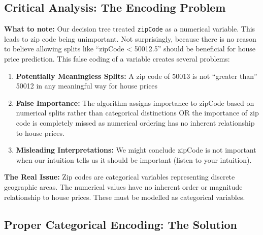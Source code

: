 \documentclass[
  letterpaper,
  DIV=11,
  numbers=noendperiod]{scrartcl}
\providecommand{\tightlist}{%
  \setlength{\itemsep}{0pt}\setlength{\parskip}{0pt}}
\begin{document}
\subsection{Critical Analysis: The Encoding
Problem}\label{critical-analysis-the-encoding-problem}

\begin{tcolorbox}[enhanced jigsaw, bottomrule=.15mm, titlerule=0mm, colbacktitle=quarto-callout-warning-color!10!white, opacityback=0, colback=white, leftrule=.75mm, breakable, bottomtitle=1mm, colframe=quarto-callout-warning-color-frame, opacitybacktitle=0.6, title=\textcolor{quarto-callout-warning-color}{\faExclamationTriangle}\hspace{0.5em}{⚠️ The Problem Revealed}, toptitle=1mm, toprule=.15mm, rightrule=.15mm, left=2mm, arc=.35mm, coltitle=black]

\textbf{What to note:} Our decision tree treated \texttt{zipCode} as a
numerical variable. This leads to zip code being unimportant. Not
surprisingly, because there is no reason to believe allowing splits like
``zipCode \textless{} 50012.5'' should be beneficial for house price
prediction. This false coding of a variable creates several problems:

\begin{enumerate}
\def\labelenumi{\arabic{enumi}.}
\tightlist
\item
  \textbf{Potentially Meaningless Splits:} A zip code of 50013 is not
  ``greater than'' 50012 in any meaningful way for house prices
\item
  \textbf{False Importance:} The algorithm assigns importance to zipCode
  based on numerical splits rather than categorical distinctions OR the
  importance of zip code is completely missed as numerical ordering has
  no inherent relationship to house prices.
\item
  \textbf{Misleading Interpretations:} We might conclude zipCode is not
  important when our intuition tells us it should be important (listen
  to your intuition).
\end{enumerate}

\textbf{The Real Issue:} Zip codes are categorical variables
representing discrete geographic areas. The numerical values have no
inherent order or magnitude relationship to house prices. These must be
modelled as categorical variables.

\end{tcolorbox}

\subsection{Proper Categorical Encoding: The
Solution}\label{proper-categorical-encoding-the-solution}
\end{document}
